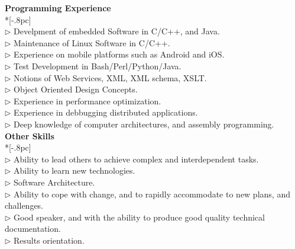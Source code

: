 \documentclass[a4paper,11pt,english]{article}
\begin{document}
{\large \bf Programming Experience} \\*[-.8pc]
\underline{\hspace{6in}} \\
$\triangleright$ Develpment of embedded Software in C/C++, and Java.\\
$\triangleright$ Maintenance of Linux Software in C/C++.\\
$\triangleright$ Experience on mobile platforms such as Android and iOS.\\
$\triangleright$ Test Development in Bash/Perl/Python/Java.\\
$\triangleright$ Notions of Web Services, XML, XML schema, XSLT.\\
$\triangleright$ Object Oriented Design Concepts.\\
$\triangleright$ Experience in performance optimization.\\
$\triangleright$ Experience in debbugging distributed applications.\\
$\triangleright$ Deep knowledge of computer architectures, and assembly programming.\\

\newpage
{\large \bf Other Skills} \\*[-.8pc]
\underline{\hspace{6in}} \\
$\triangleright$ Ability to lead others to achieve complex and interdependent tasks.\\
$\triangleright$ Ability to learn new technologies.\\
$\triangleright$ Software Architecture.\\
$\triangleright$ Ability to cope with change, and to rapidly accommodate to new plans, and challenges.\\
$\triangleright$ Good speaker, and with the ability to produce good quality technical documentation.\\
$\triangleright$ Results orientation.\\
\end{document}
